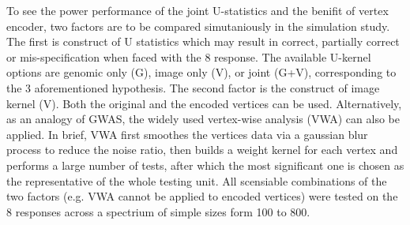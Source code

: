 \documentclass[twocolumn]{article}
\begin{document}
To see the power performance of the joint U-statistics and the benifit of vertex encoder, two factors are to be compared simutaniously in the simulation study. The first is construct of U statistics which may result in correct, partially correct or mis-specification when faced with the 8 response. The available U-kernel options are genomic only (G), image only (V), or joint (G+V), corresponding to the 3 aforementioned hypothesis. The second factor is the construct of image kernel (V). Both the original and the encoded vertices can be used. Alternatively, as an analogy of GWAS, the widely used vertex-wise analysis (VWA) can also be applied. In brief, VWA first smoothes the vertices data via a gaussian blur process to reduce the noise ratio, then builds a weight kernel for each vertex and performs a large number of tests, after which the most significant one is chosen as the representative of the whole testing unit. All scensiable combinations of the two factors (e.g. VWA cannot be applied to encoded vertices) were tested on the 8 responses across a spectrium of simple sizes form 100 to 800. 

\end{document}
